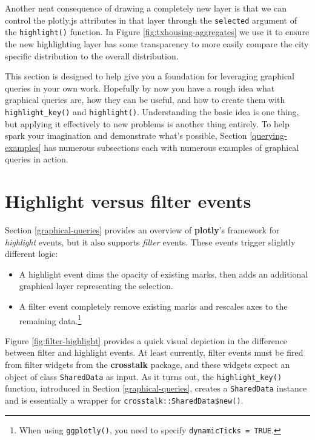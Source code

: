 \documentclass[
  12pt,
]{krantz}
\providecommand{\tightlist}{%
  \setlength{\itemsep}{0pt}\setlength{\parskip}{0pt}}
\begin{document}
Another neat consequence of drawing a completely new layer is that we can control the plotly.js attributes in that layer through the \texttt{selected} argument of the \texttt{highlight()} function. In Figure \ref{fig:txhousing-aggregates} we use it to ensure the new highlighting layer has some transparency to more easily compare the city specific distribution to the overall distribution.

This section is designed to help give you a foundation for leveraging graphical queries in your own work. Hopefully by now you have a rough idea what graphical queries are, how they can be useful, and how to create them with \texttt{highlight\_key()} and \texttt{highlight()}. Understanding the basic idea is one thing, but applying it effectively to new problems is another thing entirely. To help spark your imagination and demonstrate what's possible, Section \ref{querying-examples} has numerous subsections each with numerous examples of graphical queries in action.

\hypertarget{filter}{%
\section{Highlight versus filter events}\label{filter}}


Section \ref{graphical-queries} provides an overview of \textbf{plotly}'s framework for \emph{highlight} events, but it also supports \emph{filter} events. These events trigger slightly different logic:

\begin{itemize}
\tightlist
\item
  A highlight event dims the opacity of existing marks, then adds an additional graphical layer representing the selection.
\item
  A filter event completely remove existing marks and rescales axes to the remaining data.\footnote{When using \texttt{ggplotly()}, you need to specify \texttt{dynamicTicks\ =\ TRUE}.}
\end{itemize}

Figure \ref{fig:filter-highlight} provides a quick visual depiction in the difference between filter and highlight events. At least currently, filter events must be fired from filter widgets from the \textbf{crosstalk} package, and these widgets expect an object of class \texttt{SharedData} as input. As it turns out, the \texttt{highlight\_key()} function, introduced in Section \ref{graphical-queries}, creates a \texttt{SharedData} instance and is essentially a wrapper for \texttt{crosstalk::SharedData\$new()}.
\end{document}
